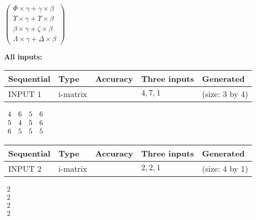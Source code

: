 \documentclass[12pt]{article}
\begin{document}
   
 $   \left( \begin{array}
 {
 c
 }
 \Phi \times  \gamma   +  \gamma \times  \beta \\ 
 \Upsilon \times  \gamma   +  \Upsilon \times  \beta \\ 
 \beta \times  \gamma   +                     \zeta \times  \beta \\ 
 \Lambda \times  \gamma   +  \Delta \times  \beta
 \end{array} \right) $ 
   
   
\noindent\vspace{0.1in}\hspace{-0.08in} {\textbf{\Large{All inputs: }}}
   
   
  
  
\noindent\begin{tabular}{|l|l|l|l|l|}
\hline
 Sequential & Type & Accuracy & Three inputs & Generated \\ 
\hline
 
 
  INPUT $           1$ & i-matrix &  & $
 4
 , 
 7
 , 
 1
 $ & (size:           3 by           4)
 \\  \hline  
 \end{tabular}
   
   
 $\begin{array}{
 c
 c
 c
 c
 }
           4 & 
           6 & 
           5 & 
           6 \\ 
           5 & 
           4 & 
           5 & 
           6 \\ 
           6 & 
           5 & 
           5 & 
           5
\end{array}  $ 
  
  
\noindent\begin{tabular}{|l|l|l|l|l|}
\hline
 Sequential & Type & Accuracy & Three inputs & Generated \\ 
\hline
 
 
  INPUT $           2$ & i-matrix &  & $
 2
 , 
 2
 , 
 1
 $ & (size:           4 by           1)
 \\  \hline  
 \end{tabular}
   
   
 $\begin{array}{
 c
 }
           2 \\ 
           2 \\ 
           2 \\ 
           2
\end{array}  $ 
  
\end{document}
